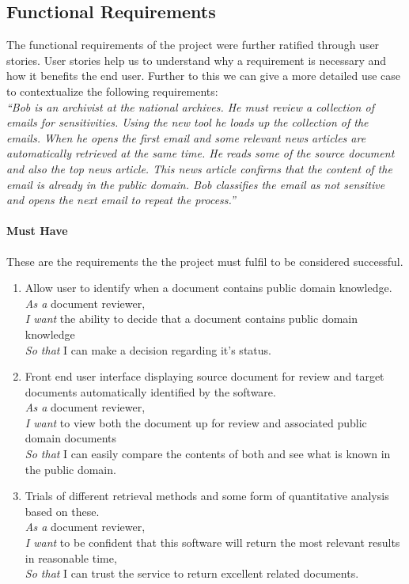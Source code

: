 \documentclass{l4proj}
\begin{document}
\subsection{Functional Requirements}
The functional requirements of the project were further ratified through user stories. User stories help us to understand why a requirement is necessary and how it benefits the end user. Further to this we can give a more detailed use case to contextualize the following requirements:\\ 
\textit{``Bob is an archivist at the national archives. He must review a collection of emails for sensitivities. Using the new tool he loads up the collection of the emails. When he opens the first email and some relevant news articles are automatically retrieved at the same time. He reads some of the source document and also the top news article. This news article confirms that the content of the email is already in the public domain. Bob classifies the email as not sensitive and opens the next email to repeat the process.''}
\paragraph{Must Have\\}
These are the requirements the the project must fulfil to be considered successful.
\begin{enumerate}[label=\textbf{M.\arabic*}]
\item Allow user to identify when a document contains public domain knowledge. \\
\textit{As a} document reviewer, \\
\textit{I want} the ability to decide that a document contains public domain knowledge \\
\textit{So that} I can make a decision regarding it's status. \\

\item Front end user interface displaying source document for review and target documents automatically identified by the software. \\
\textit{As a} document reviewer, \\
\textit{I want} to view both the document up for review and associated public domain documents \\
\textit{So that} I can easily compare the contents of both and see what is known in the public domain.

\item Trials of different retrieval methods and some form of quantitative analysis based on these. \\
\textit{As a} document reviewer, \\
\textit{I want} to be confident that this software will return the most relevant results in reasonable time, \\
\textit{So that} I can trust the service to return excellent related documents.
\end{enumerate}
\end{document}
